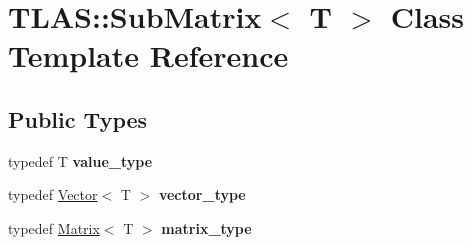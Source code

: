 \hypertarget{classTLAS_1_1SubMatrix}{}\section{T\+L\+AS\+:\+:Sub\+Matrix$<$ T $>$ Class Template Reference}
\label{classTLAS_1_1SubMatrix}
\subsection*{Public Types}
\begin{DoxyCompactItemize}
\item 
\mbox{\label{classTLAS_1_1SubMatrix_aae8b60ce01d753714a7889279c8b7211}} 
typedef T {\bfseries value\+\_\+type}
\item 
\mbox{\label{classTLAS_1_1SubMatrix_a0caaa4de7d7938dbc00e6c43becba213}} 
typedef \hyperlink{classTLAS_1_1Vector}{Vector}$<$ T $>$ {\bfseries vector\+\_\+type}
\item 
\mbox{\label{classTLAS_1_1SubMatrix_a587906aacc81c3e4883ac19d88f180f4}} 
typedef \hyperlink{classTLAS_1_1Matrix}{Matrix}$<$ T $>$ {\bfseries matrix\+\_\+type}
\end{DoxyCompactItemize}
